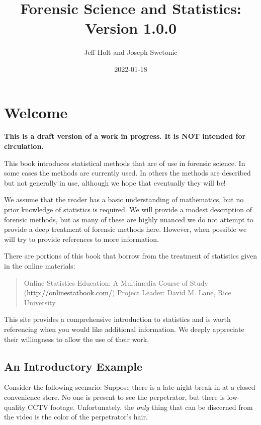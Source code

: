 \documentclass[
]{book}
\title{Forensic Science and Statistics: Version 1.0.0}
\author{Jeff Holt and Joseph Swetonic}
\date{2022-01-18}
\begin{document}
\maketitle

{
\setcounter{tocdepth}{1}
\tableofcontents
}
\hypertarget{welcome}{%
\chapter{Welcome}\label{welcome}}

\textbf{This is a draft version of a work in progress. It is NOT intended for circulation.}

This book introduces statistical methods that are of use in forensic science.
In some cases the methods are currently used.
In others the methods are described but not generally in use,
although we hope that eventually they will be!

We assume that the reader has a basic understanding of mathematics, but no prior
knowledge of statistics is required.
We will provide a modest description of forensic methods, but as many of these are
highly nuanced we do not attempt to
provide a deep treatment of forensic methods here. However, when possible we will
try to provide references to more information.

There are portions of this book that borrow from the treatment of statistics
given in the online materials:

\begin{quote}
Online Statistics Education: A Multimedia Course of Study (\url{http://onlinestatbook.com/})
Project Leader: David M. Lane, Rice University
\end{quote}

This site provides a comprehensive introduction to statistics and is worth referencing when you would like additional information.
We deeply appreciate their willingness to allow the use of their work.

\hypertarget{an-introductory-example}{%
\section{An Introductory Example}\label{an-introductory-example}}

Consider the following scenario:
Suppose there is a late-night break-in at a closed convenience store.
No one is present to see the perpetrator, but there is low-quality CCTV footage.
Unfortunately, the \emph{only} thing that can be discerned from the video is the
color of the perpetrator's hair.
\end{document}
